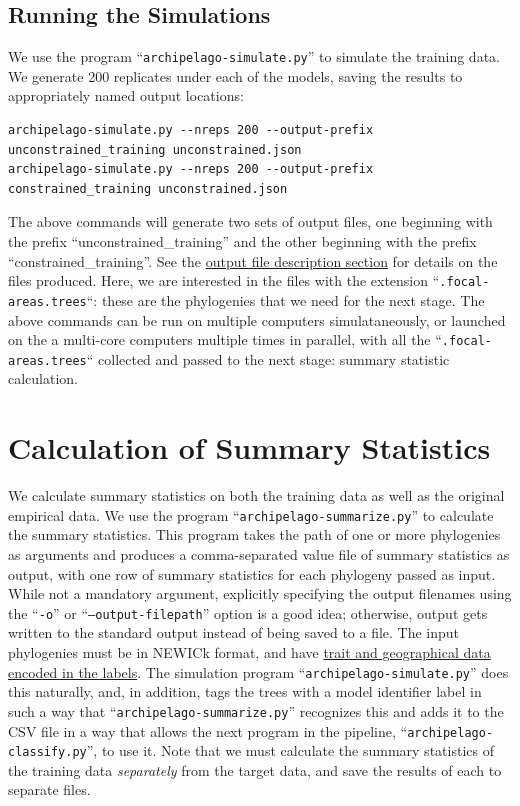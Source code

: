 \documentclass[11pt,openany]{memoir} %
\begin{document}
\subsection{Running the Simulations}
We use the program ``\texttt{archipelago-simulate.py}'' to simulate the training data.
We generate 200 replicates under each of the models, saving the results to appropriately named output locations:
\begin{lstlisting}
archipelago-simulate.py --nreps 200 --output-prefix unconstrained_training unconstrained.json
archipelago-simulate.py --nreps 200 --output-prefix constrained_training unconstrained.json
\end{lstlisting}
The above commands will generate two sets of output files, one beginning with the prefix ``unconstrained\_training'' and the other beginning with the prefix ``constrained\_training''.
See the \hyperref[sec:description-of-output-files]{output file description section} for details on the files produced.
Here, we are interested in the files with the extension ``\texttt{.focal-areas.trees}``: these are the phylogenies that we need for the next stage.
The above commands can be run on multiple computers simulataneously, or launched on the a multi-core computers multiple times in parallel, with all the ``\texttt{.focal-areas.trees}`` collected and passed to the next stage: summary statistic calculation.

\section{Calculation of Summary Statistics}

We calculate summary statistics on both the training data as well as the original empirical data.
We use the program ``\texttt{archipelago-summarize.py}'' to calculate the summary statistics.
This program takes the path of one or more phylogenies as arguments and produces a comma-separated value file of summary statistics as output, with one row of summary statistics for each phylogeny passed as input.
While not a mandatory argument, explicitly specifying the output filenames using the ``\texttt{-o}'' or ``\texttt{--output-filepath}'' option is a good idea; otherwise, output gets written to the standard output instead of being saved to a file.
The input phylogenies must be in NEWICk format, and have \hyperref[sec:workflow-encoding-the-target-data]{trait and geographical data encoded in the labels}.
The simulation program ``\texttt{archipelago-simulate.py}'' does this naturally, and, in addition, tags the trees with a model identifier label in such a way that ``\texttt{archipelago-summarize.py}'' recognizes this and adds it to the CSV file in a way that allows the next program in the pipeline, ``\texttt{archipelago-classify.py}'', to use it.
Note that we must calculate the summary statistics of the training data \textit{separately} from the target data, and save the results of each to separate files.
\end{document}
